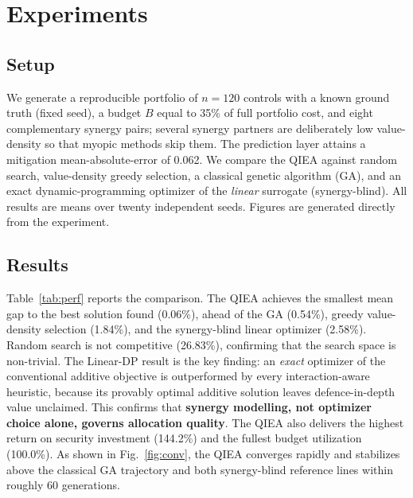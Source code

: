 \documentclass[preprint,12pt]{elsarticle}
\begin{document}
\section{Experiments}
\label{sec:exp}

\subsection{Setup}
We generate a reproducible portfolio of $n = 120$ controls with a known ground truth
(fixed seed), a budget $B$ equal to 35\% of full portfolio cost, and eight complementary
synergy pairs; several synergy partners are deliberately low value-density so that
myopic methods skip them. The prediction layer attains a mitigation mean-absolute-error
of 0.062. We compare the QIEA against random search, value-density greedy selection, a
classical genetic algorithm (GA), and an exact dynamic-programming optimizer of the
\emph{linear} surrogate (synergy-blind). All results are means over twenty independent
seeds. Figures are generated directly from the experiment.

\subsection{Results}
Table~\ref{tab:perf} reports the comparison. The QIEA achieves the smallest mean gap to
the best solution found (0.06\%), ahead of the GA (0.54\%), greedy value-density
selection (1.84\%), and the synergy-blind linear optimizer (2.58\%). Random search is
not competitive (26.83\%), confirming that the search space is non-trivial. The
Linear-DP result is the key finding: an \emph{exact} optimizer of the conventional
additive objective is outperformed by every interaction-aware heuristic, because its
provably optimal additive solution leaves defence-in-depth value unclaimed. This
confirms that \textbf{synergy modelling, not optimizer choice alone, governs allocation
quality}. The QIEA also delivers the highest return on security investment (144.2\%) and
the fullest budget utilization (100.0\%). As shown in Fig.~\ref{fig:conv}, the QIEA
converges rapidly and stabilizes above the classical GA trajectory and both
synergy-blind reference lines within roughly 60 generations.
\end{document}
